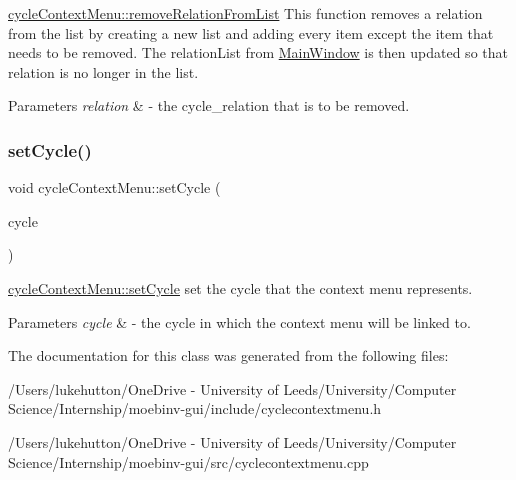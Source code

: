 \mbox{\hyperlink{classcycle_context_menu_a83f3eb1ea5338154095a7bf1e2c77b01}{cycle\+Context\+Menu\+::remove\+Relation\+From\+List}} This function removes a relation from the list by creating a new list and adding every item except the item that needs to be removed. The \textquotesingle{}relation\+List\textquotesingle{} from \mbox{\hyperlink{class_main_window}{Main\+Window}} is then updated so that \textquotesingle{}relation\textquotesingle{} is no longer in the list. 


\begin{DoxyParams}{Parameters}
{\em relation} & -\/ the cycle\+\_\+relation that is to be removed. \\
\hline
\end{DoxyParams}
\mbox{\label{classcycle_context_menu_adf29caf51604118b6ced6a02c5172252}} 
\subsubsection{\texorpdfstring{set\+Cycle()}{setCycle()}}
{\footnotesize\ttfamily void cycle\+Context\+Menu\+::set\+Cycle (\begin{DoxyParamCaption}\item[{Gi\+Na\+C\+::ex}]{cycle }\end{DoxyParamCaption})}



\mbox{\hyperlink{classcycle_context_menu_adf29caf51604118b6ced6a02c5172252}{cycle\+Context\+Menu\+::set\+Cycle}} set the cycle that the context menu represents. 


\begin{DoxyParams}{Parameters}
{\em cycle} & -\/ the cycle in which the context menu will be \textquotesingle{}linked\textquotesingle{} to. \\
\hline
\end{DoxyParams}


The documentation for this class was generated from the following files\+:\begin{DoxyCompactItemize}
\item 
/\+Users/lukehutton/\+One\+Drive -\/ University of Leeds/\+University/\+Computer Science/\+Internship/moebinv-\/gui/include/cyclecontextmenu.\+h\item 
/\+Users/lukehutton/\+One\+Drive -\/ University of Leeds/\+University/\+Computer Science/\+Internship/moebinv-\/gui/src/cyclecontextmenu.\+cpp\end{DoxyCompactItemize}
